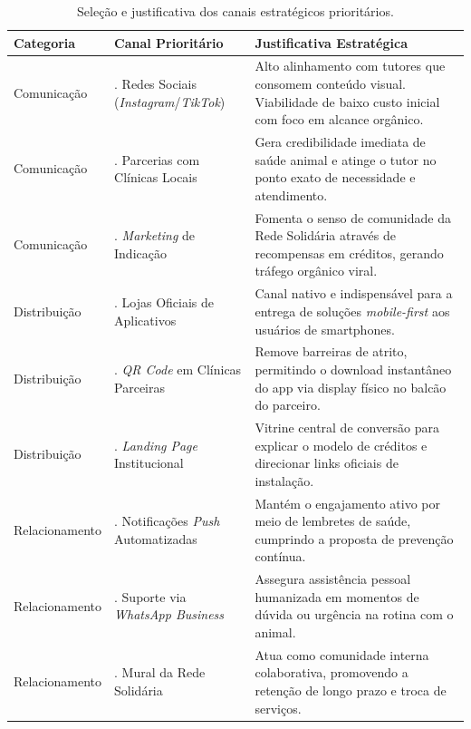 \begin{table}[H]
\centering
\small
\begin{tabular}{@{}>{\raggedright\arraybackslash}p{3.2cm}>{\raggedright\arraybackslash}p{4.2cm}>{\raggedright\arraybackslash}p{6.3cm}@{}}

\toprule
\textbf{Categoria} & \textbf{Canal Prioritário} & \textbf{Justificativa Estratégica} \\
\midrule
Comunicação & 1. Redes Sociais (\textit{Instagram}/\textit{TikTok}) & Alto alinhamento com tutores que consomem conteúdo visual. Viabilidade de baixo custo inicial com foco em alcance orgânico. \\
\addlinespace
Comunicação & 2. Parcerias com Clínicas Locais & Gera credibilidade imediata de saúde animal e atinge o tutor no ponto exato de necessidade e atendimento. \\
\addlinespace
Comunicação & 3. \textit{Marketing} de Indicação & Fomenta o senso de comunidade da Rede Solidária através de recompensas em créditos, gerando tráfego orgânico viral. \\
\midrule
Distribuição & 1. Lojas Oficiais de Aplicativos & Canal nativo e indispensável para a entrega de soluções \textit{mobile-first} aos usuários de smartphones. \\
\addlinespace
Distribuição & 2. \textit{QR Code} em Clínicas Parceiras & Remove barreiras de atrito, permitindo o download instantâneo do app via display físico no balcão do parceiro. \\
\addlinespace
Distribuição & 3. \textit{Landing Page} Institucional & Vitrine central de conversão para explicar o modelo de créditos e direcionar links oficiais de instalação. \\
\midrule
Relacionamento & 1. Notificações \textit{Push} Automatizadas & Mantém o engajamento ativo por meio de lembretes de saúde, cumprindo a proposta de prevenção contínua. \\
\addlinespace
Relacionamento & 2. Suporte via \textit{WhatsApp Business} & Assegura assistência pessoal humanizada em momentos de dúvida ou urgência na rotina com o animal. \\
\addlinespace
Relacionamento & 3. Mural da Rede Solidária & Atua como comunidade interna colaborativa, promovendo a retenção de longo prazo e troca de serviços. \\
\bottomrule
\end{tabular}
\caption{Seleção e justificativa dos canais estratégicos prioritários.}
\label{tab:estrategia}
\end{table}

